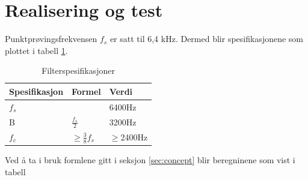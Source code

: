 \section{Realisering og test}
\label{sec:research}

Punktprøvingsfrekvensen $f_s$ er satt til 6,4 kHz. Dermed blir spesifikasjonene som plottet i tabell \ref{tab:spec}. 

\begin{table}[ht]
    \caption{Filterspesifikasjoner}
    \centering
    \begin{tabular}{|l|l|l|}
        \hline
        Spesifikasjon & Formel                              & Verdi        \\ \hline
        $f_s$         &                                     & 6400Hz       \\ \hline
        B             & $\frac{f_s}{2}$                     & 3200Hz       \\ \hline
        $f_c$         & $\geq\frac{3}{8}f_s$                & $\geq$2400Hz \\ \hline
    \end{tabular}
    \label{tab:spec}
\end{table}

Ved å ta i bruk formlene gitt i seksjon \ref{sec:concept} blir beregninene som vist i tabell

